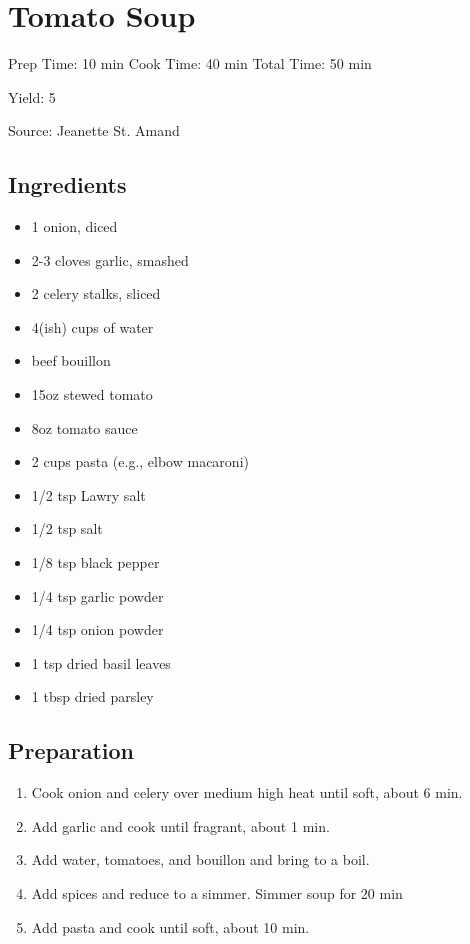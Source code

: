 \section{Tomato Soup}

\begin{center}
Prep Time: 10 min
Cook Time: 40 min
Total Time: 50 min

\noindent Yield: 5

\vspace{1em}

Source: Jeanette St. Amand
\end{center}

\subsection{Ingredients}
\begin{multicols}{2}
\begin{itemize}
    \item 1 onion, diced
    \item 2-3 cloves garlic, smashed
    \item 2 celery stalks, sliced
    \item 4(ish) cups of water
    \item beef bouillon 
    \item 15oz stewed tomato
    \item 8oz tomato sauce
    \item 2 cups pasta (e.g., elbow macaroni)
    \item 1/2 tsp Lawry salt
    \item 1/2 tsp salt
    \item 1/8 tsp black pepper
    \item 1/4 tsp garlic powder
    \item 1/4 tsp onion powder
    \item 1 tsp dried basil leaves
    \item 1 tbsp dried parsley 
\end{itemize}
\end{multicols}

\subsection{Preparation}
\begin{enumerate}
    \item Cook onion and celery over medium high heat until soft, about 6 min.
    \item Add garlic and cook until fragrant, about 1 min.
    \item Add water, tomatoes, and bouillon and bring to a boil.
    \item Add spices and reduce to a simmer. Simmer soup for 20 min
    \item Add pasta and cook until soft, about 10 min.
\end{enumerate}

